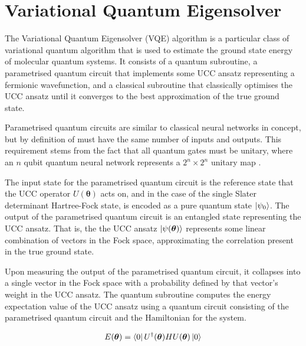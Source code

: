 \section{\label{vqe}Variational Quantum Eigensolver}

The Variational Quantum Eigensolver (VQE) algorithm is a particular class of variational quantum algorithm that is used to estimate the ground state energy of molecular quantum systems. It consists of a quantum subroutine, a parametrised quantum circuit that implements some UCC ansatz representing a fermionic wavefunction, and a classical subroutine that classically optimises the UCC ansatz until it converges to the best approximation of the true ground state.

Parametrised quantum circuits are similar to classical neural networks in concept, but by definition of must have the same number of inputs and outputs. This requirement stems from the fact that all quantum gates must be unitary, where an $n$ qubit quantum neural network represents a $2^n \times 2^n$ unitary map \cite{Yeung2020}.

The input state for the parametrised quantum circuit is the reference state that the UCC operator $U(\bm\theta)$ acts on, and in the case of the single Slater determinant Hartree-Fock state, is encoded as a pure quantum state $\ket{\psi_0}$. The output of the parametrised quantum circuit is an entangled state representing the UCC ansatz. That is, the the UCC ansatz $\ket{\psi(\bm\theta)}$ represents some linear combination of vectors in the Fock space, approximating the correlation present in the true ground state.

Upon measuring the output of the parametrised quantum circuit, it collapses into a single vector in the Fock space with a probability defined by that vector's weight in the UCC ansatz. The quantum subroutine computes the energy expectation value of the UCC ansatz using a quantum circuit consisting of the parametrised quantum circuit and  the Hamiltonian for the system.

\begin{equation*}
    E(\bm\theta) = \bra{0} U^\dagger(\bm\theta) H U(\bm\theta) \ket{0} 
\end{equation*}
